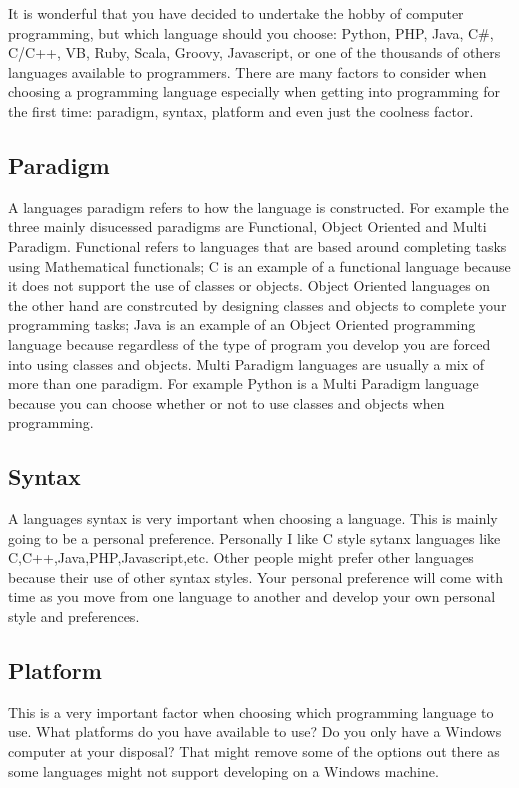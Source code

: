 It is wonderful that you have decided to undertake the hobby of computer programming, but which language should you choose: Python, PHP, Java, C\#,
C/C++, VB, Ruby, Scala, Groovy, Javascript, or one of the thousands of others languages available to programmers. There are many factors to consider
when choosing a programming language especially when getting into programming for the first time: paradigm, syntax, platform and even just the
coolness factor.
\newline

\subsection{Paradigm}
A languages paradigm refers to how the language is constructed. For example the three mainly disucessed paradigms are Functional, Object Oriented
and Multi Paradigm. Functional refers to languages that are based around completing tasks using Mathematical functionals; C is an example of
a functional language because it does not support the use of classes or objects. Object Oriented languages on the other hand are constrcuted
by designing classes and objects to complete your programming tasks; Java is an example of an Object Oriented programming language because
regardless of the type of program you develop you are forced into using classes and objects. Multi Paradigm languages are usually a mix
of more than one paradigm. For example Python is a Multi Paradigm language because you can choose whether or not to use classes and objects
when programming.

\subsection{Syntax}
A languages syntax is very important when choosing a language. This is mainly going to be a personal preference. Personally I like C style
sytanx languages like C,C++,Java,PHP,Javascript,etc. Other people might prefer other languages because their use of other syntax styles. Your
personal preference will come with time as you move from one language to another and develop your own personal style and preferences.

\subsection{Platform}
This is a very important factor when choosing which programming language to use. What platforms do you have available to use? Do you only have
a Windows computer at your disposal? That might remove some of the options out there as some languages might not support developing on a 
Windows machine.

